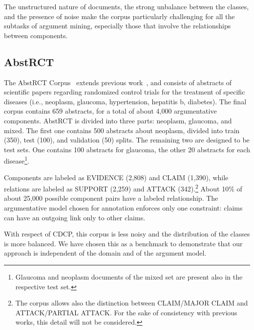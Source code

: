 \documentclass[journal]{IEEEtran}
\begin{document}
\iffalse
        \begin{figure*}[t]
          \centering
          \texttt{[image: figs/example.png]}
          \caption{Argumentation structure in one of the documents of the CDCP corpus.
          \label{fig:example_CDCP}}
        \end{figure*}
\fi

The unstructured nature of documents, the strong unbalance between the classes, and the presence of noise make the corpus particularly challenging for all the subtasks of argument mining, especially those that involve the relationships between components.



\subsection{AbstRCT}

The AbstRCT Corpus~\cite{DBLP:conf/ecai/0002CV20} extends previous work~\cite{DBLP:conf/comma/MayerC0TV18}, and consists of abstracts of scientific papers regarding randomized control trials for the treatment of specific diseases (i.e., neoplasm, glaucoma, hypertension, hepatitis b, diabetes). The final corpus contains 659 abstracts, for a total of about 4,000 argumentative components.
AbstRCT is divided into three parts: neoplasm, glaucoma, and mixed. The first one contains 500 abstracts about neoplasm, divided into train (350), test (100), and validation (50) splits. The remaining two are designed to be test sets. One contains 100 abstracts for glaucoma, the other 20 abstracts for each disease\footnote{Glaucoma and neoplasm documents of the mixed set are present also in the respective test set.}.

Components are labeled as EVIDENCE (2,808) and CLAIM (1,390), while relations are labeled as SUPPORT (2,259) and ATTACK (342).\footnote{The corpus allows also the distinction between CLAIM/MAJOR CLAIM and ATTACK/PARTIAL ATTACK. For the sake of consistency with previous works, this detail will not be considered.} About 10\% of about 25,000 possible component pairs have a labeled relationship. The argumentative model chosen for annotation enforces only one constraint: claims can have an outgoing link only to other claims.


With respect of CDCP, this corpus is less noisy and the distribution of the classes is more balanced. We have chosen this as a benchmark to demonstrate that our approach is independent of the domain and of the argument model.
\end{document}
